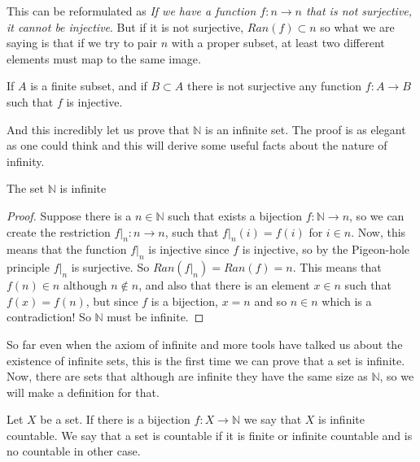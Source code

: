 \documentclass{tufte-handout}
\begin{document}
This can be reformulated as \textit{If we have a function $f: n \to n$ that is not surjective, it cannot be injective}. But if it is not surjective, $Ran(f) \subset n$ so what we are saying is that if we try to pair $n$ with a proper subset, at least two different elements must map to the same image.

\begin{corollary}
	If $A$ is a finite subset, and if $B \subset A$ there is not surjective any function $f: A \to B$ such that $f$ is injective.
\end{corollary}

And this incredibly let us prove that $\mathbb{N}$ is an infinite set. The proof is as elegant as one could think and this will derive some useful facts about the nature of infinity.

\begin{theorem}
	The set $\mathbb{N}$ is infinite
\end{theorem}
\begin{proof}
	Suppose there is a $n \in \mathbb{N}$ such that exists a bijection $f: \mathbb{N} \to n$, so we can create the restriction $f|_n: n \to n$, such that $f|_n(i) = f(i)$ for $i \in n$. Now, this means that the function $f|_n$ is injective since $f$ is injective, so by the Pigeon-hole principle $f|_n$ is surjective. So $Ran(f|_n) = Ran(f) = n$. This means that $f(n) \in n$ although $n \not \in n$, and also that there is an element $x \in n$ such that $f(x) = f(n)$, but since $f$ is a bijection, $x = n$ and so $n \in n$ which is a contradiction! So $\mathbb{N}$ must be infinite.
\end{proof}

So far even when the axiom of infinite and more tools have talked us about the existence of infinite sets, this is the first time we can prove that a set is infinite. Now, there are sets that although are infinite they have the same size as $\mathbb{N}$, so we will make a definition for that.

\begin{definition}
	Let $X$ be a set. If there is a bijection $f: X \to \mathbb{N}$ we say that $X$ is infinite countable. We say that a set is countable if it is finite or infinite countable and is no countable in other case. 
\end{definition}
\end{document}
